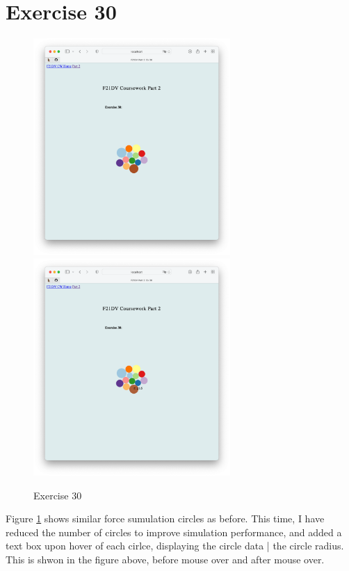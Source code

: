 \documentclass{scrreprt}
\begin{document}
\section{Exercise 30}
\begin{figure}[!ht]
    \centering
    \includegraphics[width = 7.5cm]{images/ex30_1.png}
    \includegraphics[width = 7.5cm]{images/ex30_2.png}
    \label{fig:ex30}
    \caption{Exercise 30}
\end{figure}
\FloatBarrier
% 
Figure \ref{fig:ex30} shows similar force sumulation circles as before. This time, I have reduced the number of circles to improve simulation performance, and added a text box upon hover of each cirlce, displaying the circle data | the circle radius. This is shwon in the figure above, before mouse over and after mouse over.
\end{document}
